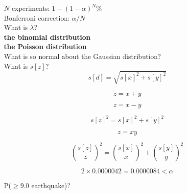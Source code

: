 \documentclass{article}
\begin{document}
$N$ experiments:   $1-(1-\alpha)^{N}\%$\\

Bonferroni correction: $\alpha/N$\\

What is $\lambda$?\\

\textbf{the binomial distribution}\\

\textbf{the Poisson distribution}\\

What is so normal about the Gaussian distribution?\\

What is $s[z]$?\\

\[
s[d] = \sqrt{s[x]^2 + s[y]^2}
\]

\[
z = x + y
\]

\[
z = x - y
\]

\[
s[z]^2 = s[x]^2 + s[y]^2
\]

\[
z = xy
\]

\[
\left(\frac{s[z]}{z}\right)^2 =
\left(\frac{s[x]}{x}\right)^2 + \left(\frac{s[y]}{y}\right)^2
\]

\[
2 \times 0.0000042 = 0.0000084 < \alpha
\]

P($\geq{9.0}$ earthquake)?
\end{document}
